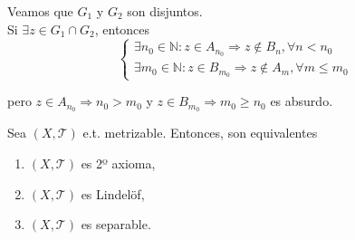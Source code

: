 \begin{dem}
\begin{itemize}
      Veamos que $G_{1}$ y $G_{2}$ son disjuntos. \\

       Si $\exists z \in G_{1} \cap G_{2}$, entonces
      \[ 
        \begin{cases}
          \exists n_{0} \in \mathbb{N} : z \in A_{n_{0}} \Rightarrow z \not \in B_{n}, \forall n < n_{0} \\
          \exists m_{0} \in \mathbb{N} : z \in B_{m_{0}} \Rightarrow z \not \in A_{m}, \forall m \leq m_{0} 
        \end{cases} 
      \] 

      pero $ z \in A_{n_{0}} \Rightarrow n_{0} > m_{0}$ y $z \in B_{m_{0}} \Rightarrow m_{0} \geq n_{0}$ es absurdo.
  \end{itemize}
\end{dem}

\begin{theo}
  Sea $( X, \mathcal{T} )$ e.t. metrizable. Entonces, son equivalentes
  \begin{enumerate}[label=(\roman*)]
    \item $( X, \mathcal{T} )$ es 2º axioma,
    \item $( X, \mathcal{T} )$ es Lindelöf,
    \item $( X, \mathcal{T} )$ es separable.
  \end{enumerate}
\end{theo}

